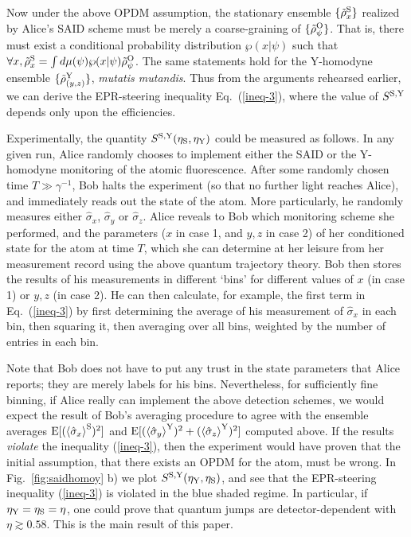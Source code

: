 \documentclass[12pt,prl,floatfix,showpacs,superscriptaddress,amsmath,amssymb]{revtex4}
\newcommand{\erf}[1]{Eq.~(\ref{#1})}
\renewcommand{\(}{\left(}
\renewcommand{\)}{\right)}
\newcommand{\an}[1]{\left\langle{#1}\right\rangle}
\renewcommand{\d}{^{\rm Y}}
\newcommand{\p}{^{\rm S}}
\newcommand{\ob}{^{\rm O}}
\newcommand{\s}[1]{\hat \sigma_{#1}}
\begin{document}
Now under the above OPDM assumption, the stationary ensemble $\{\tilde\rho\p_x \}$ 
 realized by Alice's SAID scheme must be merely a coarse-graining of 
$\{\tilde\rho\ob_\psi  \}$. That is, there must exist a conditional probability distribution $\wp(x|\psi)$ 
such that $\forall x, \tilde\rho\p_x = \int d\mu(\psi) \wp(x|\psi) \tilde\rho\ob_\psi$.
The same statements hold for the Y-homodyne ensemble $\{\tilde\rho\d_{(y,z)}\}$, {\em mutatis mutandis}. Thus 
from the arguments rehearsed earlier, we can derive the EPR-steering inequality \erf{ineq-3}, where the value of $S^{\rm S,Y}$  depends only upon the efficiencies. 

Experimentally, the quantity $S^{\rm S,Y}(\eta_{\rm S},\eta_{\rm Y})$ could be measured as follows. In any given run, Alice randomly chooses to implement either the SAID or the Y-homodyne monitoring of the atomic fluorescence. After some randomly chosen time $T \gg \gamma^{-1}$, Bob halts the experiment (so that no further light reaches Alice), and immediately reads out the state of the atom. More particularly, he randomly measures either $\s{x}$, $\s{y}$ or $\s{z}$.  Alice reveals to Bob  which monitoring scheme she performed, and the parameters ($x$ in case 1, and $y, z$ in  case 2) of her conditioned state for the atom at time $T$, which she can determine at her leisure from her measurement record using the above quantum trajectory theory. Bob then stores the results of his measurements in different `bins' for different values of $x$ (in case 1) or $y, z$ (in case 2). He can then calculate, for example, the first term in \erf{ineq-3} by first determining the average of his measurement of $\s{x}$ in each bin, then squaring it, then averaging over all bins, weighted by the number of entries in each bin. 

Note that Bob does not have to put any trust in the state parameters that Alice reports; they are merely labels for his bins. Nevertheless, for sufficiently fine binning, if Alice really can implement the above detection schemes, we would expect the result of Bob's averaging procedure to agree with the ensemble averages ${\rm E}[(\an{\s{x}}\p)^2]$ and ${\rm E}[(\an{\s{y}}\d)^2 + (\an{\s{z}}\d)^2]$ computed above. If the results {\em violate} the inequality (\ref{ineq-3}), then the experiment would have proven that 
the initial assumption, that there exists an OPDM for the atom, must be wrong. In Fig.~\ref{fig:saidhomoy} b) we plot $S^{\rm S,Y}(\eta_{\rm Y},\eta_{\rm S})$, and see that the EPR-steering inequality (\ref{ineq-3}) is violated in the blue shaded regime. 
In particular, if $\eta_{\rm Y} = \eta_{\rm S} = \eta$, one could prove that quantum jumps are  detector-dependent with 
 $\eta\gtrsim 0.58$. This is the main result of this paper. 
 
\end{document}
